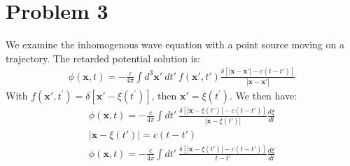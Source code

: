 \documentclass[a4paper,12pt]{article}
\numberwithin{equation}{section}
\newcommand{\bvp}[1]{\textbf{#1}'}
\newcommand{\bv}[1]{\textbf{#1}}
\begin{document}
\section{Problem 3}
We examine the inhomogenous wave equation with a point source moving on a trajectory. 
The retarded potential solution is:
\begin{gather}
 \phi(\bv{x},t)=-\frac{c}{4\pi}\int d^3\bvp{x}\ dt'\ f(\bvp{x},t')\frac{\delta\left [|\bv{x}-\bvp{x}|-c(t-t')\right ]}{|\bv{x}-\bvp{x}|}
\end{gather}
With $f(\bvp{x},t^{'})=\delta\left[\bvp{x}-\xi(t^{'})\right]$, then $\bvp{x}=\xi(t^{'})$. We then have:
\begin{gather}
 \phi(\bv{x},t)=-\frac{c}{4\pi}\int dt'\ \frac{\delta\left [|\bv{x}-\xi(t')|-c(t-t')\right ]}{|\bv{x}-\xi(t')|} \frac{d\xi}{dt}\\
 |\bv{x}-\xi(t')| = c(t-t')\\
 \phi(\bv{x},t)=-\frac{c}{4\pi}\int dt'\ \frac{\delta\left [|\bv{x}-\xi(t')|-c(t-t')\right ]}{t-t'} \frac{d\xi}{dt}
\end{gather}
\end{document}
